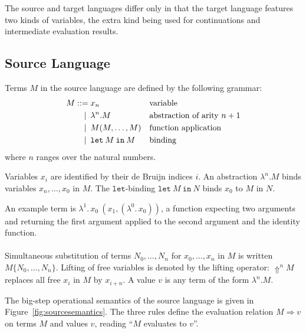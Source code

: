 \documentclass[a4paper,11pt,draft]{article}
\newcommand{\kw}[1]{\mathtt{#1}}
\begin{document}
The source and target languages differ only in that the target language
features two kinds of variables, the extra kind being used for continuations
and intermediate evaluation results.

\subsection{Source Language}

Terms $M$ in the source language are defined by the following grammar:
\begin{align*}
M ::=             &\; x_{n}
                  && \text{variable} \\
\llap{\textbar\:} &\; \lambda^{n}.M
                  && \text{abstraction of arity $n+1$} \\
\llap{\textbar\:} &\; M(M, \ldots, M)
                  && \text{function application} \\
\llap{\textbar\:} &\; \kw{let} \: M \: \kw{in} \: M
                  && \text{binding}
\end{align*}
where $n$ ranges over the natural numbers.

Variables $x_{i}$ are identified by their de Bruijn indices $i$.
An abstraction $\lambda^{n}.M$ binds variables $x_{n}, \ldots, x_{0}$ in $M$. The
$\kw{let}$-binding $\kw{let} \: M \: \kw{in} \: N$ binds $x_{0}$ to $M$ in $N$.

An example term is $\lambda^{1}. \, x_{0} \: (x_{1}, (\lambda^{0}. \, x_{0}))$, a
function expecting two arguments and returning the first argument applied to the
second argument and the identity function.

\paragraph{}

Simultaneous substitution of terms $N_{0}, \ldots, N_{n}$ for
$x_{0}, \ldots, x_{n}$ in $M$ is written $M\{N_{0}, \ldots, N_{n}\}$.
Lifting of free variables is denoted by the lifting operator: $\Uparrow^{n} M$
replaces all free $x_{i}$ in $M$ by $x_{i+n}$. A value $v$ is any term of the
form $\lambda^{n}.M$.

The big-step operational semantics of the source language is given in
Figure~\ref{fig:sourcesemantics}. The three rules define the evaluation relation
$M \Rightarrow v$ on terms $M$ and values $v$, reading ``$M$ evaluates to $v$''.
\end{document}
